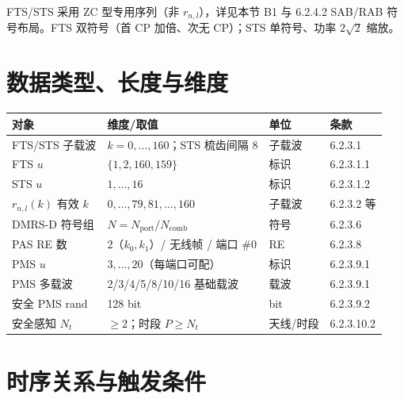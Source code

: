 \documentclass[11pt,a4paper]{ctexart}
\begin{document}
FTS/STS 采用 ZC 型专用序列（非 $r_{n,l}$），详见本节 B1 与 6.2.4.2 SAB/RAB 符号布局。FTS 双符号（首 CP 加倍、次无 CP）；STS 单符号、功率 $2\sqrt{2}$ 缩放。

\section{数据类型、长度与维度}

\begin{table}[h]
\centering
\small
\begin{tabular}{llll}
\toprule
\textbf{对象} & \textbf{维度/取值} & \textbf{单位} & \textbf{条款} \\
\midrule
FTS/STS 子载波 & $k{=}0,\ldots,160$；STS 梳齿间隔 8 & 子载波 & 6.2.3.1 \\
FTS $u$ & $\{1,2,160,159\}$ & 标识 & 6.2.3.1.1 \\
STS $u$ & $1,\ldots,16$ & 标识 & 6.2.3.1.2 \\
$r_{n,l}(k)$ 有效 $k$ & $0,\ldots,79,81,\ldots,160$ & 子载波 & 6.2.3.2 等 \\
DMRS-D 符号组 & $N = N_{\mathrm{port}}/N_{\mathrm{comb}}$ & 符号 & 6.2.3.6 \\
PAS RE 数 & 2（$k_0,k_1$）/ 无线帧 / 端口 \#0 & RE & 6.2.3.8 \\
PMS $u$ & $3,\ldots,20$（每端口可配） & 标识 & 6.2.3.9.1 \\
PMS 多载波 & 2/3/4/5/8/10/16 基础载波 & 载波 & 6.2.3.9.1 \\
安全 PMS rand & 128 bit & bit & 6.2.3.9.2 \\
安全感知 $N_t$ & $\geq 2$；时段 $P\geq N_t$ & 天线/时段 & 6.2.3.10.2 \\
\bottomrule
\end{tabular}
\end{table}

\section{时序关系与触发条件}
\end{document}
